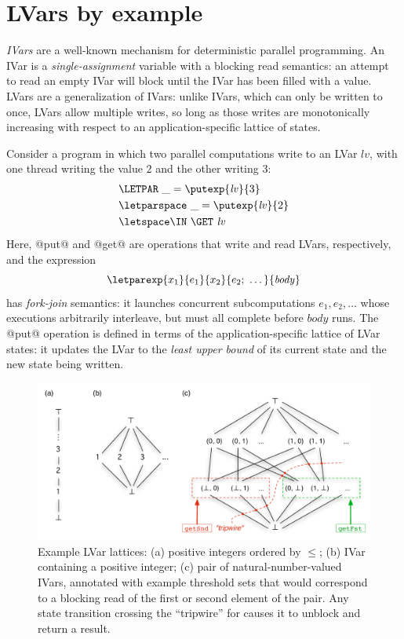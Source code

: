 \section{LVars by example}\label{section:lvars-examples}

\emph{IVars} \cite{IStructures, id, CnC, monad-par} are a well-known
mechanism for deterministic parallel programming.  An IVar is a
\emph{single-assignment} variable \cite{Tesler-1968} with a blocking
read semantics: an attempt to read an empty IVar will block until the
IVar has been filled with a value.  LVars are a generalization of
IVars: unlike IVars, which can only be written to once, LVars allow
multiple writes, so long as those writes are monotonically increasing
with respect to an application-specific lattice of states.

Consider a program in which two parallel computations write to an LVar
$\mathit{lv}$, with one thread writing the value $2$ and the other
writing $3$:
\begin{equation}
\begin{split}
& \LETPAR ~\_ = \putexp{\mathit{lv}}{3} \\
&  \letparspace ~\_ = \putexp{\mathit{lv}}{2} \\
&  \letspace \IN~ \GET~\mathit{lv}
\end{split}
\label{e:lvar-example-1}
\end{equation}
Here, @put@ and @get@ are operations that write and read LVars,
respectively, and the expression
\begin{displaymath}
\letparexp{x_1}{e_1}{x_2}{e_2;~\dots}{\mathit{body}}
\end{displaymath}
has \emph{fork-join} semantics: it launches concurrent subcomputations
$e_1, e_2, \dots$ whose executions arbitrarily interleave, but must
all complete before $\mathit{body}$ runs.  The @put@ operation is
defined in terms of the application-specific lattice of LVar states:
it updates the LVar to the \emph{least upper bound} of its current
state and the new state being written.

\begin{figure}
\centering
\includegraphics[width=5in]{chapter3/figures/ExampleLattices3.pdf} 
  \caption{Example LVar lattices: (a) positive integers ordered by
    $\leq$; (b) IVar containing a positive integer; (c) pair of
    natural-number-valued IVars, annotated with example threshold sets
    that would correspond to a blocking read of the first or second
    element of the pair.  Any state transition crossing the
    ``tripwire'' for  causes it to unblock and return
    a result.}
  \label{f:lvars-example-lattices}
\end{figure}

